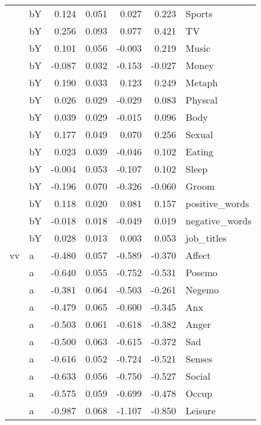 \documentclass[11pt,a4paper]{article}
\begin{document}
\begin{longtable}{llrrrrl}
   & bY &  0.124 &  0.051 &    0.027 &     0.223 &          Sports \\
   & bY &  0.256 &  0.093 &    0.077 &     0.421 &              TV \\
   & bY &  0.101 &  0.056 &   -0.003 &     0.219 &           Music \\
   & bY & -0.087 &  0.032 &   -0.153 &    -0.027 &           Money \\
   & bY &  0.190 &  0.033 &    0.123 &     0.249 &          Metaph \\
   & bY &  0.026 &  0.029 &   -0.029 &     0.083 &         Physcal \\
   & bY &  0.039 &  0.029 &   -0.015 &     0.096 &            Body \\
   & bY &  0.177 &  0.049 &    0.070 &     0.256 &          Sexual \\
   & bY &  0.023 &  0.039 &   -0.046 &     0.102 &          Eating \\
   & bY & -0.004 &  0.053 &   -0.107 &     0.102 &           Sleep \\
   & bY & -0.196 &  0.070 &   -0.326 &    -0.060 &           Groom \\
   & bY &  0.118 &  0.020 &    0.081 &     0.157 &  positive\_words \\
   & bY & -0.018 &  0.018 &   -0.049 &     0.019 &  negative\_words \\
   & bY &  0.028 &  0.013 &    0.003 &     0.053 &      job\_titles \\
vv & a & -0.480 &  0.057 &   -0.589 &    -0.370 &          Affect \\
   & a & -0.640 &  0.055 &   -0.752 &    -0.531 &          Posemo \\
   & a & -0.381 &  0.064 &   -0.503 &    -0.261 &          Negemo \\
   & a & -0.479 &  0.065 &   -0.600 &    -0.345 &             Anx \\
   & a & -0.503 &  0.061 &   -0.618 &    -0.382 &           Anger \\
   & a & -0.500 &  0.063 &   -0.615 &    -0.372 &             Sad \\
   & a & -0.616 &  0.052 &   -0.724 &    -0.521 &          Senses \\
   & a & -0.633 &  0.056 &   -0.750 &    -0.527 &          Social \\
   & a & -0.575 &  0.059 &   -0.699 &    -0.478 &           Occup \\
   & a & -0.987 &  0.068 &   -1.107 &    -0.850 &         Leisure \\

\end{longtable}
\end{document}
